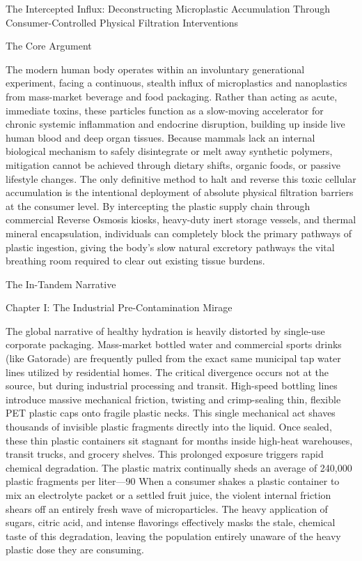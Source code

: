 The Intercepted Influx: Deconstructing Microplastic Accumulation Through Consumer-Controlled Physical Filtration Interventions

The Core Argument

The modern human body operates within an involuntary generational experiment, facing a continuous, stealth influx of microplastics and nanoplastics from mass-market beverage and food packaging. Rather than acting as acute, immediate toxins, these particles function as a slow-moving accelerator for chronic systemic inflammation and endocrine disruption, building up inside live human blood and deep organ tissues.
Because mammals lack an internal biological mechanism to safely disintegrate or melt away synthetic polymers, mitigation cannot be achieved through dietary shifts, organic foods, or passive lifestyle changes. The only definitive method to halt and reverse this toxic cellular accumulation is the intentional deployment of absolute physical filtration barriers at the consumer level.
By intercepting the plastic supply chain through commercial Reverse Osmosis kiosks, heavy-duty inert storage vessels, and thermal mineral encapsulation, individuals can completely block the primary pathways of plastic ingestion, giving the body’s slow natural excretory pathways the vital breathing room required to clear out existing tissue burdens.

The In-Tandem Narrative

Chapter I: The Industrial Pre-Contamination Mirage

The global narrative of healthy hydration is heavily distorted by single-use corporate packaging. Mass-market bottled water and commercial sports drinks (like Gatorade) are frequently pulled from the exact same municipal tap water lines utilized by residential homes. The critical divergence occurs not at the source, but during industrial processing and transit. High-speed bottling lines introduce massive mechanical friction, twisting and crimp-sealing thin, flexible PET plastic caps onto fragile plastic necks. This single mechanical act shaves thousands of invisible plastic fragments directly into the liquid.
Once sealed, these thin plastic containers sit stagnant for months inside high-heat warehouses, transit trucks, and grocery shelves. This prolonged exposure triggers rapid chemical degradation. The plastic matrix continually sheds an average of 240,000 plastic fragments per liter—90%
When a consumer shakes a plastic container to mix an electrolyte packet or a settled fruit juice, the violent internal friction shears off an entirely fresh wave of microparticles. The heavy application of sugars, citric acid, and intense flavorings effectively masks the stale, chemical taste of this degradation, leaving the population entirely unaware of the heavy plastic dose they are consuming.

